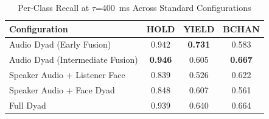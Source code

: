 \begin{table}[h]
\caption{Per-Class Recall at $\tau$=400~ms Across Standard Configurations}
\label{tab:recall_per_class_standard}
\small
\renewcommand{\arraystretch}{1.20}
\begin{tabular}{>{\raggedright\arraybackslash}p{4cm}ccc}
\toprule
Configuration & HOLD & YIELD & BCHAN \\
\midrule
Audio Dyad (Early Fusion) & 0.942 & \textbf{0.731} & 0.583 \\
Audio Dyad (Intermediate Fusion) & \textbf{0.946} & 0.605 & \textbf{0.667} \\
Speaker Audio + Listener Face & 0.839 & 0.526 & 0.622 \\
Speaker Audio + Face Dyad & 0.848 & 0.607 & 0.561 \\
Full Dyad & 0.939 & 0.640 & 0.664 \\
\bottomrule
\end{tabular}
\end{table}
